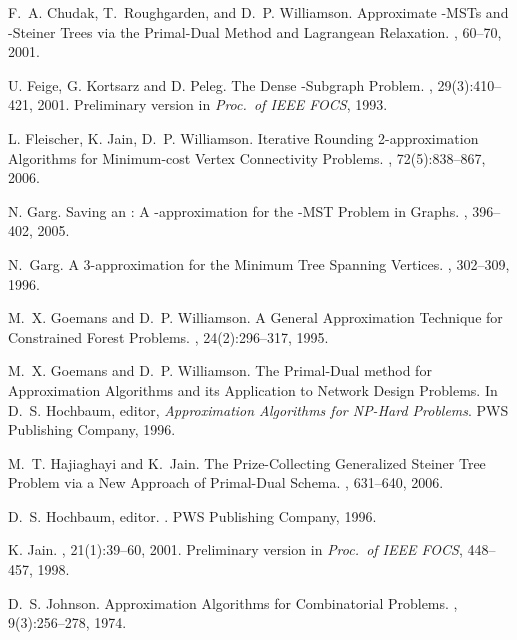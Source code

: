 \documentclass[11pt]{article}
\begin{document}
\begin{thebibliography}{99}
F.~A. Chudak, T.~Roughgarden, and D.~P. Williamson.
\newblock Approximate -MSTs and -Steiner Trees via the Primal-Dual
Method and Lagrangean Relaxation.
, 60--70, 2001.

U. Feige, G. Kortsarz and D. Peleg.
\newblock The Dense -Subgraph Problem.
, 29(3):410--421, 2001.
\newblock Preliminary version in {\em Proc.\ of IEEE FOCS}, 1993.

L. Fleischer, K. Jain, D.~P. Williamson.
\newblock Iterative Rounding 2-approximation Algorithms for Minimum-cost Vertex
Connectivity Problems.
, 72(5):838--867, 2006.

N. Garg.
\newblock Saving an : A -approximation for the -MST Problem in 
Graphs.
, 396--402, 2005.

N.~Garg.
\newblock A 3-approximation for the Minimum Tree Spanning  Vertices.
, 302--309, 1996.

M.~X. Goemans and D.~P. Williamson.
\newblock A General Approximation Technique for Constrained Forest Problems.
, 24(2):296--317, 1995.

M.~X. Goemans and D.~P. Williamson.
\newblock The Primal-Dual method for Approximation Algorithms and its
  Application to Network Design Problems.
\newblock In D.~S. Hochbaum, editor, {\em Approximation Algorithms for NP-Hard
  Problems}. PWS Publishing Company, 1996.

M.~T. Hajiaghayi and K.~Jain.
\newblock The Prize-Collecting Generalized Steiner Tree Problem via a New
Approach of Primal-Dual Schema.
, 631--640, 2006.

D.~S. Hochbaum, editor.
.
\newblock PWS Publishing Company, 1996.

K. Jain.
, 21(1):39--60, 2001.
Preliminary version in {\em Proc.\ of IEEE FOCS}, 448--457, 1998.

D.~S. Johnson.
\newblock Approximation Algorithms for Combinatorial Problems.
, 9(3):256--278, 1974.


\end{thebibliography}
\end{document}
